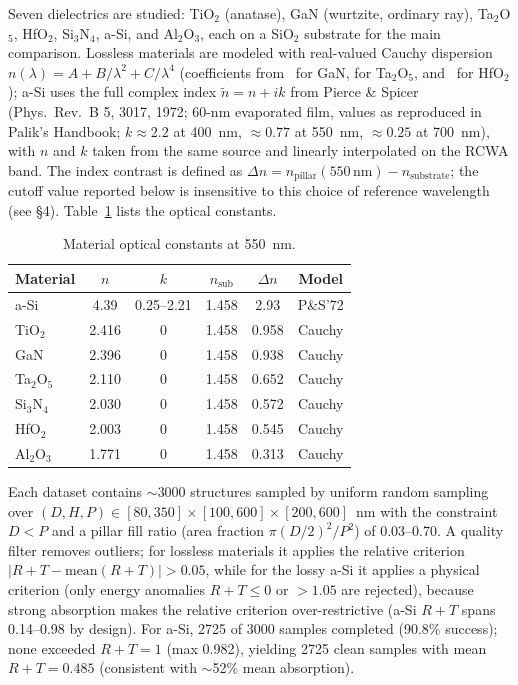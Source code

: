 \documentclass[10pt,twocolumn]{article}
\begin{document}
Seven dielectrics are studied: TiO$_2$ (anatase), GaN (wurtzite, ordinary ray), Ta$_2$O$_5$, HfO$_2$, Si$_3$N$_4$, a-Si, and Al$_2$O$_3$, each on a SiO$_2$ substrate for the main comparison. Lossless materials are modeled with real-valued Cauchy dispersion $n(\lambda) = A + B/\lambda^2 + C/\lambda^4$ (coefficients from~\cite{ref29} for GaN, \cite{ref30} for Ta$_2$O$_5$, and~\cite{ref31} for HfO$_2$); a-Si uses the full complex index $\tilde{n} = n + ik$ from Pierce \& Spicer~\cite{ref12} (Phys.\ Rev.\ B 5, 3017, 1972; 60-nm evaporated film, values as reproduced in Palik's Handbook; $k \approx 2.2$ at 400~nm, $\approx 0.77$ at 550~nm, $\approx 0.25$ at 700~nm), with $n$ and $k$ taken from the same source and linearly interpolated on the RCWA band. The index contrast is defined as $\Delta n = n_{\mathrm{pillar}}(550\,\mathrm{nm}) - n_{\mathrm{substrate}}$; the cutoff value reported below is insensitive to this choice of reference wavelength (see \S4). Table~\ref{tab:materials} lists the optical constants.

\begin{table}[!t]
\centering
\caption{Material optical constants at 550~nm.}
\footnotesize
\label{tab:materials}
\begin{tabular}{@{}lccccc@{}}
\toprule
Material & $n$ & $k$ & $n_{\mathrm{sub}}$ & $\Delta n$ & Model \\
\midrule
a-Si & 4.39 & 0.25--2.21 & 1.458 & 2.93 & P\&S'72 \\
TiO$_2$ & 2.416 & 0 & 1.458 & 0.958 & Cauchy \\
GaN & 2.396 & 0 & 1.458 & 0.938 & Cauchy \\
Ta$_2$O$_5$ & 2.110 & 0 & 1.458 & 0.652 & Cauchy \\
Si$_3$N$_4$ & 2.030 & 0 & 1.458 & 0.572 & Cauchy \\
HfO$_2$ & 2.003 & 0 & 1.458 & 0.545 & Cauchy \\
Al$_2$O$_3$ & 1.771 & 0 & 1.458 & 0.313 & Cauchy \\
\bottomrule
\end{tabular}
\end{table}

Each dataset contains $\sim$3000 structures sampled by uniform random sampling over $(D, H, P) \in [80, 350] \times [100, 600] \times [200, 600]$~nm with the constraint $D < P$ and a pillar fill ratio (area fraction $\pi(D/2)^2/P^2$) of 0.03--0.70. A quality filter removes outliers; for lossless materials it applies the relative criterion $|R+T - \mathrm{mean}(R+T)| > 0.05$, while for the lossy a-Si it applies a physical criterion (only energy anomalies $R+T \le 0$ or $> 1.05$ are rejected), because strong absorption makes the relative criterion over-restrictive (a-Si $R+T$ spans 0.14--0.98 by design). For a-Si, 2725 of 3000 samples completed (90.8\% success); none exceeded $R+T = 1$ (max 0.982), yielding 2725 clean samples with mean $R+T = 0.485$ (consistent with $\sim$52\% mean absorption).
\end{document}
